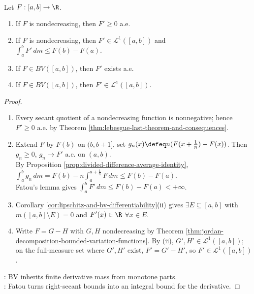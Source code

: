 \begin{corollary} \label{cor:monotone-and-bv-derivatives-integrable} \\
Let $F:[a,b]\to\R$.
\begin{enumerate}[label=(\roman*)]
\setlength{\itemsep}{0pt}
\item If $F$ is nondecreasing, then $F'\geq0$ a.e.
\item If $F$ is nondecreasing, then $F'\in\mathscr{L}^1([a,b])$ and $\int_a^bF'\,dm\leq F(b)-F(a)$.
\item If $F\in BV([a,b])$, then $F'$ exists a.e.
\item If $F\in BV([a,b])$, then $F'\in\mathscr{L}^1([a,b])$.
\end{enumerate}
\begin{proof}
\begin{enumerate}[label=(\roman*)]
\setlength{\itemsep}{0pt}
\item Every secant quotient of a nondecreasing function is nonnegative; hence $F'\geq0$ a.e. by Theorem \ref{thm:lebesgue-last-theorem-and-consequences}.
\item Extend $F$ by $F(b)$ on $(b,b+1]$, set $g_n(x)\defeq n(F(x+\frac{1}{n})-F(x))$. Then $g_n\geq0$, $g_n\to F'$ a.e. on $(a,b)$.\\
By Proposition \ref{prop:divided-difference-average-identity}, $\int_a^bg_n\,dm=F(b)-n\int_a^{a+\frac{1}{n}}F\,dm\leq F(b)-F(a)$.\\
Fatou's lemma gives $\int_a^bF'\,dm\leq F(b)-F(a)<+\infty$.
\item Corollary \ref{cor:lipschitz-and-bv-differentiability}(ii) gives $\exists E\subseteq[a,b]$ with $m([a,b]\setminus E)=0$ and $F'(x)\in\R$ $\forall x\in E$.
\item Write $F=G-H$ with $G,H$ nondecreasing by Theorem \ref{thm:jordan-decomposition-bounded-variation-functions}. By (ii), $G',H'\in\mathscr{L}^1([a,b])$; on the full-measure set where $G',H'$ exist, $F'=G'-H'$, so $F'\in\mathscr{L}^1([a,b])$.
\end{enumerate}
: BV inherits finite derivative mass from monotone parts.\\
: Fatou turns right-secant bounds into an integral bound for the derivative.
\end{proof}
\end{corollary}
